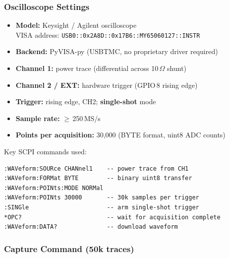 %

\subsubsection*{Oscilloscope Settings}

\begin{itemize}
  \item \textbf{Model:} Keysight / Agilent oscilloscope\\
        VISA address: \texttt{USB0::0x2A8D::0x17B6::MY65060127::INSTR}
  \item \textbf{Backend:} PyVISA-py (USBTMC, no proprietary driver required)
  \item \textbf{Channel 1:} power trace (differential across 10\,$\Omega$ shunt)
  \item \textbf{Channel 2 / EXT:} hardware trigger (GPIO\,8 rising edge)
  \item \textbf{Trigger:} rising edge, CH2; \textbf{single-shot} mode
  \item \textbf{Sample rate:} $\geq$\,250\,MS/s
  \item \textbf{Points per acquisition:} 30{,}000 (BYTE format, uint8 ADC counts)
\end{itemize}

Key SCPI commands used:
\begin{verbatim}
:WAVeform:SOURce CHANnel1    -- power trace from CH1
:WAVeform:FORMat BYTE        -- binary uint8 transfer
:WAVeform:POINts:MODE NORMal
:WAVeform:POINts 30000       -- 30k samples per trigger
:SINGle                      -- arm single-shot trigger
*OPC?                        -- wait for acquisition complete
:WAVeform:DATA?              -- download waveform
\end{verbatim}

\subsubsection*{Capture Command (50k traces)}


